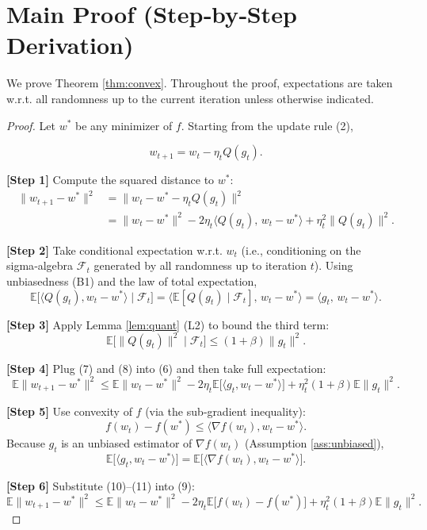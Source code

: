 \documentclass{article}
\newcommand{\EE}{\mathbb{E}}
\begin{document}
\section*{Main Proof (Step‑by‑Step Derivation)}
We prove Theorem \ref{thm:convex}. Throughout the proof, expectations are taken w.r.t. all randomness up to the current iteration unless otherwise indicated.

\begin{proof}
Let $w^*$ be any minimizer of $f$. Starting from the update rule (2),

\[
w_{t+1}=w_t-\eta_t Q(g_t). \tag{5}
\]

\textbf{[Step 1]} Compute the squared distance to $w^*$:
\[
\begin{aligned}
\|w_{t+1}-w^*\|^{2}
&= \|w_t-w^*-\eta_t Q(g_t)\|^{2}  \\
&= \|w_t-w^*\|^{2}
-2\eta_t\langle Q(g_t),\,w_t-w^*\rangle
+\eta_t^{2}\|Q(g_t)\|^{2}. \tag{6}
\end{aligned}
\]

\textbf{[Step 2]} Take conditional expectation w.r.t. $w_t$ (i.e., conditioning on the sigma‑algebra $\mathcal{F}_t$ generated by all randomness up to iteration $t$). Using unbiasedness (B1) and the law of total expectation,
\[
\EE\!\big[\langle Q(g_t),w_t-w^*\rangle\mid\mathcal{F}_t\big]
= \langle\EE[Q(g_t)\mid\mathcal{F}_t],\,w_t-w^*\rangle
= \langle g_t,\,w_t-w^*\rangle. \tag{7}
\]

\textbf{[Step 3]} Apply Lemma \ref{lem:quant} (L2) to bound the third term:
\[
\EE\!\big[\|Q(g_t)\|^{2}\mid\mathcal{F}_t\big]
\le (1+\beta)\|g_t\|^{2}. \tag{8}
\]

\textbf{[Step 4]} Plug (7) and (8) into (6) and then take full expectation:
\[
\EE\|w_{t+1}-w^*\|^{2}
\le \EE\|w_t-w^*\|^{2}
-2\eta_t\EE\big[\langle g_t,w_t-w^*\rangle\big]
+\eta_t^{2}(1+\beta)\EE\|g_t\|^{2}. \tag{9}
\]

\textbf{[Step 5]} Use convexity of $f$ (via the sub‑gradient inequality):
\[
f(w_t)-f(w^*)\le \langle\nabla f(w_t),w_t-w^*\rangle. \tag{10}
\]
Because $g_t$ is an unbiased estimator of $\nabla f(w_t)$ (Assumption \ref{ass:unbiased}),
\[
\EE\big[\langle g_t,w_t-w^*\rangle\big]=\EE\big[\langle\nabla f(w_t),w_t-w^*\rangle\big]. \tag{11}
\]

\textbf{[Step 6]} Substitute (10)–(11) into (9):
\[
\EE\|w_{t+1}-w^*\|^{2}
\le \EE\|w_t-w^*\|^{2}
-2\eta_t\EE\big[f(w_t)-f(w^*)\big]
+\eta_t^{2}(1+\beta)\EE\|g_t\|^{2}. \tag{12}
\]


\end{proof}
\end{document}
